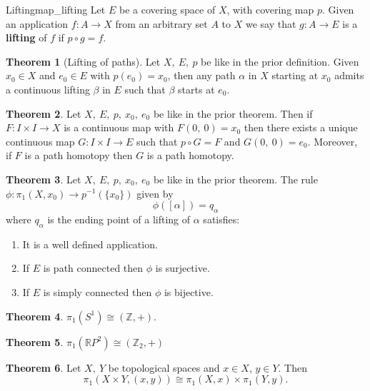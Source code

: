 \documentclass[a4paper]{book}
\theoremstyle{definition}
\newtheorem{theorem}{Theorem}[section]
\theoremstyle{ejemplo}
\theoremstyle{demostracion}
\newcommand{\reales}{\mathbb{R}}
\newcommand{\enteros}{\mathbb{Z}}
\begin{document}
\begin{define}{Lifting}{map_lifting}
	Let $E$ be a covering space of $X$, with covering map $p$. Given an application $f: A \rightarrow X$ from an arbitrary set $A$ to $X$ we say that $g: A \rightarrow E$ is a \textbf{lifting} of $f$ if $p \circ g = f$.
\end{define}

\begin{theorem}[Lifting of paths]
	Let $X,\ E,\ p$ be like in the prior definition. Given $x_0 \in X$ and $e_0 \in E$ with $p(e_0) = x_0$, then any path $\alpha$ in $X$ starting at $x_0$ admits a continuous lifting $\beta$ in $E$ such that $\beta$ starts at $e_0$.
\end{theorem}

\begin{theorem}
	Let $X,\ E,\ p,\ x_0,\ e_0$ be like in the prior theorem. Then if $F: I \times I \rightarrow X$ is a continuous map with $F(0,\ 0)=x_0$ then there exists a unique continuous map $G:I \times I \rightarrow E$ such that $p \circ G = F$ and $G(0,\ 0)=e_0$. Moreover, if $F$ is a path homotopy then $G$ is a path homotopy.
\end{theorem}

\begin{theorem}
	Let $X,\ E,\ p,\ x_0,\ e_0$ be like in the prior theorem. The rule $\phi : \pi_1(X, x_0) \rightarrow p^{-1}(\{ x_0\})$ given by
	\begin{equation*}
		\phi([\alpha]) = q_{\alpha}
	\end{equation*}
	where $q_{\alpha}$ is the ending point of a lifting of $\alpha$ satisfies:
	\begin{enumerate}
		\item
		It is a well defined application.
		\item
		If $E$ is path connected then $\phi$ is surjective.
		\item
		If $E$ is simply connected then $\phi$ is bijective.
	\end{enumerate}
\end{theorem}

\begin{theorem}
	$\pi_1(S^1) \cong (\enteros, +)$.
\end{theorem}

\begin{theorem}
	$\pi_1(\reales P^2) \cong (\enteros_2, +)$
\end{theorem}

\begin{theorem}
	Let $X,\ Y$ be topological spaces and $x \in X$, $y \in Y$. Then
	\begin{equation*}
		\pi_1(X \times Y, (x,y)) \cong \pi_1(X, x) \times \pi_1(Y, y).
	\end{equation*}
\end{theorem}
\end{document}
